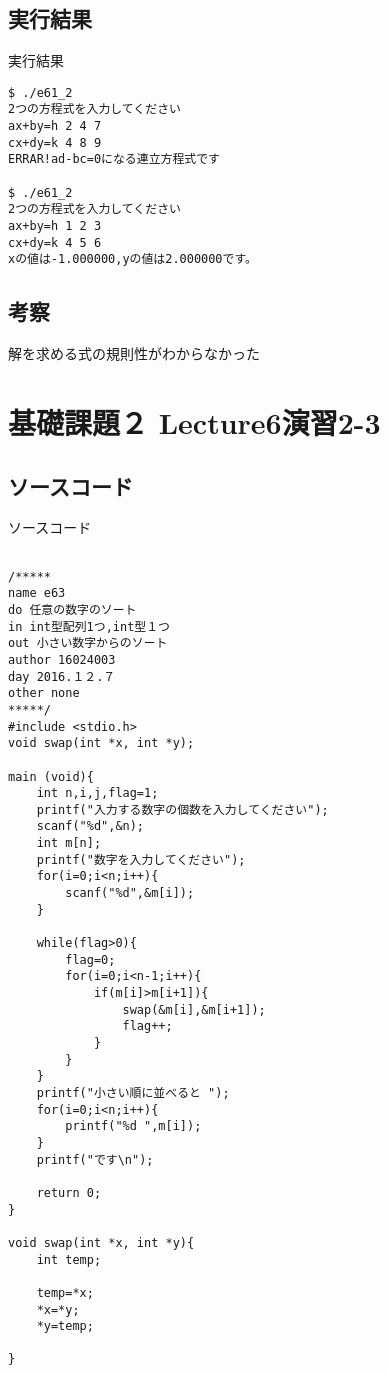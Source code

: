 \documentclass[a4j,titlepage]{jarticle}
\begin{document}
\subsection{実行結果}
\begin{itembox}[l]{実行結果}
\begin{verbatim}
$ ./e61_2
2つの方程式を入力してください
ax+by=h 2 4 7
cx+dy=k 4 8 9
ERRAR!ad-bc=0になる連立方程式です

$ ./e61_2
2つの方程式を入力してください
ax+by=h 1 2 3
cx+dy=k 4 5 6
xの値は-1.000000,yの値は2.000000です。
\end{verbatim}
\end{itembox}

\subsection{考察}
解を求める式の規則性がわからなかった

\section{基礎課題２ Lecture6演習2-3}
\subsection{ソースコード}
\begin{breakitembox}[l]{ソースコード}
\begin{verbatim}

/*****
name e63
do 任意の数字のソート
in int型配列1つ,int型１つ
out 小さい数字からのソート
author 16024003
day 2016.１２.７
other none 
*****/
#include <stdio.h>
void swap(int *x, int *y);

main (void){
    int n,i,j,flag=1;
    printf("入力する数字の個数を入力してください");
    scanf("%d",&n);
    int m[n];
    printf("数字を入力してください");
    for(i=0;i<n;i++){
        scanf("%d",&m[i]);
    }

    while(flag>0){
        flag=0;
        for(i=0;i<n-1;i++){
            if(m[i]>m[i+1]){
                swap(&m[i],&m[i+1]);
                flag++;
            }
        }
    }
    printf("小さい順に並べると ");
    for(i=0;i<n;i++){
        printf("%d ",m[i]);
    }
    printf("です\n");

    return 0;
}

void swap(int *x, int *y){
    int temp;
    
    temp=*x;
    *x=*y;
    *y=temp;

}
\end{verbatim}
\end{breakitembox}
\end{document}
